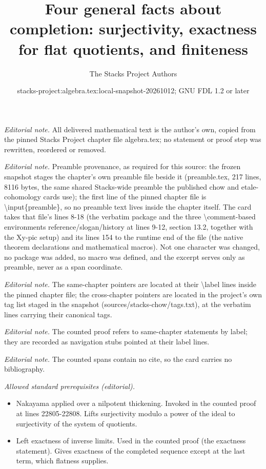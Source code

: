 \documentclass[10pt,a4paper]{amsart}
\title{Four general facts about completion: surjectivity, exactness for flat quotients, and finiteness}
\author{The Stacks Project Authors}
\date{stacks-project:algebra.tex:local-snapshot-20261012; GNU FDL 1.2 or later}
\theoremstyle{plain}
\theoremstyle{definition}
\theoremstyle{remark}
\numberwithin{equation}{subsection}
\begin{document}
\maketitle
\noindent\textit{Editorial note.} All delivered mathematical text is the author's own, copied from the pinned Stacks Project chapter file algebra.tex; no statement or proof step was rewritten, reordered or removed.\par\medskip
\noindent\textit{Editorial note.} Preamble provenance, as required for this source: the frozen snapshot stages the chapter's own preamble file beside it (preamble.tex, 217 lines, 8116 bytes, the same shared Stacks-wide preamble the published chow and etale-cohomology cards use); the first line of the pinned chapter file is \textbackslash{}input\{preamble\}, so no preamble text lives inside the chapter itself. The card takes that file's lines 8-18 (the verbatim package and the three \textbackslash{}comment-based environments reference/slogan/history at lines 9-12, section 13.2, together with the Xy-pic setup) and its lines 154 to the runtime end of the file (the native theorem declarations and mathematical macros). Not one character was changed, no package was added, no macro was defined, and the excerpt serves only as preamble, never as a span coordinate.\par\medskip
\noindent\textit{Editorial note.} The same-chapter pointers are located at their \textbackslash{}label lines inside the pinned chapter file; the cross-chapter pointers are located in the project's own tag list staged in the snapshot (sources/stacks-chow/tags.txt), at the verbatim lines carrying their canonical tags.\par\medskip
\noindent\textit{Editorial note.} The counted proof refers to same-chapter statements by label; they are recorded as navigation stubs pointed at their label lines.\par\medskip
\noindent\textit{Editorial note.} The counted spans contain no cite, so the card carries no bibliography.\par\medskip
\noindent\textit{Allowed standard prerequisites (editorial).}\begin{itemize}
\item Nakayama applied over a nilpotent thickening. Invoked in the counted proof at lines 22805-22808. Lifts surjectivity modulo a power of the ideal to surjectivity of the system of quotients.
\item Left exactness of inverse limits. Used in the counted proof (the exactness statement). Gives exactness of the completed sequence except at the last term, which flatness supplies.
\end{itemize}\medskip
\end{document}
